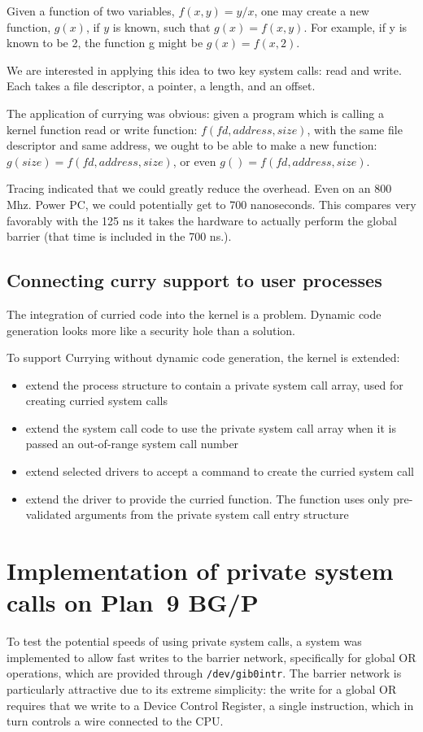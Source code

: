 \documentclass[a4,10pt,preprint]{sigplanconf}
\begin{document}
Given a function of two variables, $ f\left( x, y\right) = y/x$, 
one may create a new function, $g\left( x\right)$, 
if $y$ is known,  such that $g\left( x\right) = f\left( x, y\right)$. 
For example, if y is known to be 2, the function g might be $g\left( x\right) = f\left( x, 2\right)$. 

We are interested in applying this idea to two key system calls: read and write. Each takes a 
file descriptor, a pointer, a length, and an offset. 

The application of currying was obvious: given a program which is calling a kernel function read or write function: $ f\left( fd, address, size\right) $, with 
the same file descriptor and same address, we ought to be able to make a new function: 
$g\left( size\right) = f\left( fd, address, size\right)$, or even 
$g\left( \right) = f\left( fd, address, size\right)$. 

Tracing indicated that we could greatly reduce the overhead. Even on an 800 Mhz. Power PC, we could 
potentially get to 700 nanoseconds. This compares very favorably with the 125 ns it takes the hardware to actually
perform the global barrier (that time is included in the 700 ns.).

\subsection{Connecting curry support to user processes}
The integration of curried code into the kernel is a problem. 
Dynamic code generation looks more like a security
hole than a solution. 

To support Currying without dynamic code generation, the kernel is extended: 
\begin{itemize}
\item extend the process structure to contain a private system call array, used for creating curried system calls
\item extend the system call code to use the private system call array when it is passed an out-of-range system 
call number
\item extend selected drivers to accept a  command to create the curried system call
\item extend the driver to provide the curried function. The function uses only pre-validated arguments from the private system call entry structure
\end{itemize}

\section{Implementation of private system calls on Plan~9 BG/P}
To test the potential speeds of using private system calls, a system was implemented to allow fast writes to the barrier network, specifically for global OR operations, which are provided through {\tt /dev/gib0intr}. The barrier network is particularly attractive due to its extreme simplicity: the write for a global OR requires that we write to a 
Device Control Register, a single instruction, which in turn controls a
wire connected to the CPU. 
\end{document}

